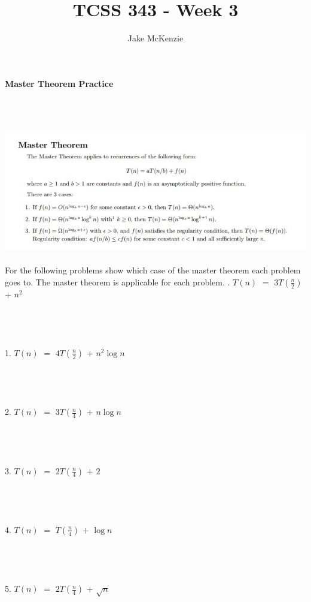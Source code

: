 \documentclass[12pt]{article}
\begin{document}
\title{TCSS 343 - Week 3}
\author{Jake McKenzie}
\maketitle
\noindent\centerline{\textbf{Master Theorem Practice}}\\\\
\\\includegraphics[width=\linewidth]{mt.jpg}\\\\
For the following problems show which case of the master theorem 
each problem goes to. The master theorem is applicable for each 
problem.
\newpage
{}. $T(n)$ $=$ $3T(\frac{n}{2})$ $+$ $n^2$\\\\\\\\\\
1. $T(n)$ $=$ $4T(\frac{n}{2})$ $+$ $n^2\log{n}$\\\\\\\\\\
2. $T(n)$ $=$ $3T(\frac{n}{4})$ $+$ $n\log{n}$\\\\\\\\\\
3. $T(n)$ $=$ $2T(\frac{n}{4})$ $+$ $2$\\\\\\\\\\
4. $T(n)$ $=$ $T(\frac{n}{4})$ $+$ $\log{n}$\\\\\\\\\\
5. $T(n)$ $=$ $2T(\frac{n}{4})$ $+$ $\sqrt{n}$\\\\\\\\\\
\end{document}
